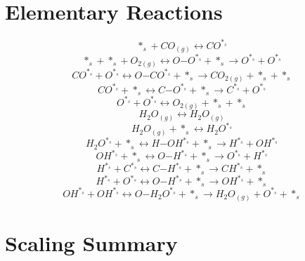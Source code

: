 \documentclass[a4paper,8pt]{report}
\begin{document}
\section{Elementary Reactions}
\begin{equation}
\label{reaction_0}
*_s+CO_{(g)} \leftrightarrow CO^{*_s}
\end{equation}
\begin{equation}
\label{reaction_1}
*_s+*_s+O_{2(g)} \leftrightarrow O\mathrm{-}O^{*_s}+*_s \rightarrow O^{*_s}+O^{*_s}
\end{equation}
\begin{equation}
\label{reaction_2}
CO^{*_s}+O^{*_s} \leftrightarrow O\mathrm{-}CO^{*_s}+*_s \rightarrow CO_{2(g)}+*_s+*_s
\end{equation}
\begin{equation}
\label{reaction_3}
CO^{*_s}+*_s \leftrightarrow C\mathrm{-}O^{*_s}+*_s \rightarrow C^{*_s}+O^{*_s}
\end{equation}
\begin{equation}
\label{reaction_4}
O^{*_s}+O^{*_s} \leftrightarrow O_{2(g)}+*_s+*_s
\end{equation}
\begin{equation}
\label{reaction_5}
H_{2}O_{(g)} \leftrightarrow H_{2}O_{(g)}
\end{equation}
\begin{equation}
\label{reaction_6}
H_{2}O_{(g)}+*_s \leftrightarrow H_{2}O^{*_s}
\end{equation}
\begin{equation}
\label{reaction_7}
H_{2}O^{*_s}+*_s \leftrightarrow H\mathrm{-}OH^{*_s}+*_s \rightarrow H^{*_s}+OH^{*_s}
\end{equation}
\begin{equation}
\label{reaction_8}
OH^{*_s}+*_s \leftrightarrow O\mathrm{-}H^{*_s}+*_s \rightarrow O^{*_s}+H^{*_s}
\end{equation}
\begin{equation}
\label{reaction_9}
H^{*_s}+C^{*_s} \leftrightarrow C\mathrm{-}H^{*_s}+*_s \rightarrow CH^{*_s}+*_s
\end{equation}
\begin{equation}
\label{reaction_10}
H^{*_s}+O^{*_s} \leftrightarrow O\mathrm{-}H^{*_s}+*_s \rightarrow OH^{*_s}+*_s
\end{equation}
\begin{equation}
\label{reaction_11}
OH^{*_s}+OH^{*_s} \leftrightarrow O\mathrm{-}H_{2}O^{*_s}+*_s \rightarrow H_{2}O_{(g)}+O^{*_s}+*_s
\end{equation}\section{Scaling Summary}
\end{document}

